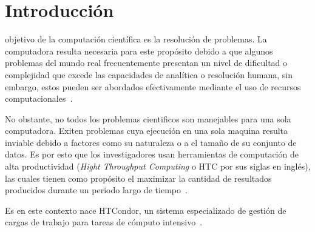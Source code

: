 \section{Introducción}
 objetivo de la computación científica es la resolución 
de problemas. La computadora resulta necesaria para este propósito debido a 
que algunos problemas del mundo real frecuentemente presentan un nivel de dificultad 
o complejidad que excede las capacidades de analítica o resolución humana, sin embargo,
estos pueden ser abordados efectivamente mediante el uso 
de recursos computacionales~\cite{landau01}. 


No obstante, no todos los problemas cientificos son
manejables para una sola computadora. Exiten problemas cuya ejecución en una sola maquina resulta 
inviable debido a factores como su naturaleza o a el tamaño de su conjunto de datos. Es por esto 
que los investigadores usan herramientas de computación de alta productividad 
(\textit{Hight Throughput Computing} o HTC por sus siglas en inglés), las cuales tienen como 
propósito el maximizar la cantidad de resultados producidos durante un periodo 
largo de tiempo~\cite{juve-01}.

Es en este contexto nace HTCondor, un sistema especializado de gestión de 
cargas de trabajo para tareas de cómputo intensivo~\cite{chang-01}.

